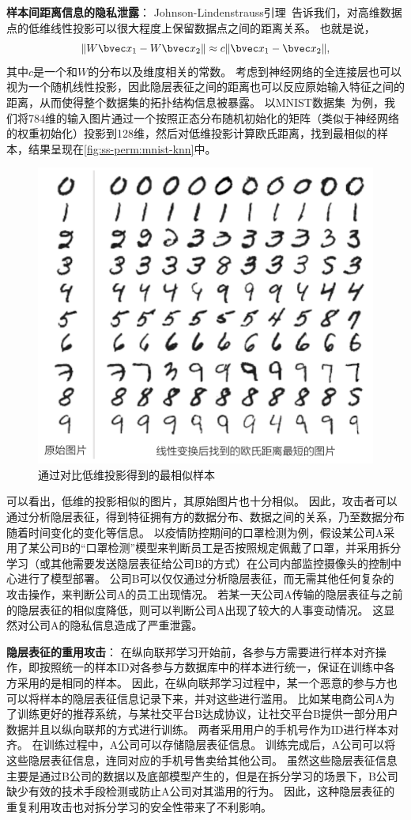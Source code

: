 \textbf{样本间距离信息的隐私泄露}：
%
Johnson-Lindenstrauss引理~\cite{matouvsek_2008_jl_lemma}告诉我们，对高维数据点的低维线性投影可以很大程度上保留数据点之间的距离关系。
%
也就是说，
\begin{equation}
    \Vert W \bvec x_1 - W \bvec x_2 \Vert \approx c\Vert \bvec x_1 - \bvec x_2 \Vert,    
\end{equation}
其中$c$是一个和$W$的分布以及维度相关的常数。
%
考虑到神经网络的全连接层也可以视为一个随机线性投影，因此隐层表征之间的距离也可以反应原始输入特征之间的距离，从而使得整个数据集的拓扑结构信息被暴露。
%
以MNIST数据集~\cite{mnist}为例，我们将784维的输入图片通过一个按照正态分布随机初始化的矩阵（类似于神经网络的权重初始化）投影到128维，然后对低维投影计算欧氏距离，找到最相似的样本，结果呈现在\autoref{fig:ss-perm:mnist-knn}中。
%
%
\begin{figure}[h!]
    \centering
    \includegraphics[width=0.66\linewidth]{Z_Resources/ss-perm_mnist-knn}
    \caption{通过对比低维投影得到的最相似样本}
    \label{fig:ss-perm:mnist-knn}
\end{figure}
%
可以看出，低维的投影相似的图片，其原始图片也十分相似。
%
因此，攻击者可以通过分析隐层表征，得到特征拥有方的数据分布、数据之间的关系，乃至数据分布随着时间变化的变化等信息。
%
以疫情防控期间的口罩检测为例，假设某公司A采用了某公司B的“口罩检测”模型来判断员工是否按照规定佩戴了口罩，并采用拆分学习（或其他需要发送隐层表征给公司B的方式）在公司内部监控摄像头的控制中心进行了模型部署。
%
公司B可以仅仅通过分析隐层表征，而无需其他任何复杂的攻击操作，来判断公司A的员工出现情况。
若某一天公司A传输的隐层表征与之前的隐层表征的相似度降低，则可以判断公司A出现了较大的人事变动情况。
%
这显然对公司A的隐私信息造成了严重泄露。


\textbf{隐层表征的重用攻击}：
在纵向联邦学习开始前，各参与方需要进行样本对齐操作，即按照统一的样本ID对各参与方数据库中的样本进行统一，保证在训练中各方采用的是相同的样本。
%
因此，在纵向联邦学习过程中，某一个恶意的参与方也可以将样本的隐层表征信息记录下来，并对这些进行滥用。
%
比如某电商公司A为了训练更好的推荐系统，与某社交平台B达成协议，让社交平台B提供一部分用户数据并且以纵向联邦的方式进行训练。
两者采用用户的手机号作为ID进行样本对齐。
%
在训练过程中，A公司可以存储隐层表征信息。
%
训练完成后，A公司可以将这些隐层表征信息，连同对应的手机号售卖给其他公司。
%
虽然这些隐层表征信息主要是通过B公司的数据以及底部模型产生的，但是在拆分学习的场景下，B公司缺少有效的技术手段检测或防止A公司对其滥用的行为。
%
因此，这种隐层表征的重复利用攻击也对拆分学习的安全性带来了不利影响。

